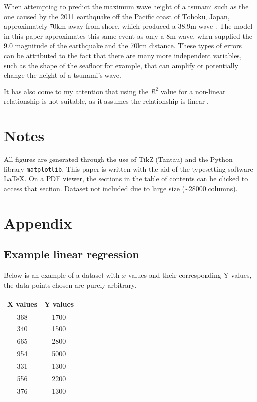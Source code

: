\documentclass[11pt,letterpaper]{article}
\begin{document}
When attempting to predict the maximum wave height of a tsunami such as the one caused by the 2011 earthquake off the Pacific coast of Tōhoku, Japan, approximately 70km away from shore, which produced a 38.9m wave \cite{yomiuri_2011}. The model in this paper approximates this same event as only a 8m wave, when supplied the 9.0 magnitude of the earthquake and the 70km distance. These types of errors can be attributed to the fact that there are many more independent variables, such as the shape of the seafloor for example, that can amplify or potentially change the height of a tsunami's wave.

It has also come to my attention that using the $R^2$ value for a non-linear relationship is not suitable, as it assumes the relationship is linear \cite{frost_2018}.


\newpage
{}


\section*{Notes}
\label{sec:notes}

All figures are generated through the use of TikZ (Tantau) and the Python library \verb|matplotlib|. This paper is written with the aid of the typesetting software \LaTeX. On a PDF viewer, the sections in the table of contents can be clicked to access that section. Dataset not included due to large size (\textasciitilde 28000 columns).

\printbibliography[heading=bibintoc, title=Works Cited]

\appendix
\section{Appendix}
\label{app}
\subsection{Example linear regression}
\label{app:regression}

Below is an example of a dataset with $x$ values and their corresponding Y values, the data points chosen are purely arbitrary.

\begin{center}
    \begin{tabular}{||c c||}
        \hline
        X values & Y values \\ [0.5ex]
        \hline\hline
        368      & 1700     \\
        \hline
        340      & 1500     \\
        \hline
        665      & 2800     \\
        \hline
        954      & 5000     \\
        \hline
        331      & 1300     \\
        \hline
        556      & 2200     \\
        \hline
        376      & 1300     \\ [1ex]
        \hline
    \end{tabular}
\end{center}
\end{document}
